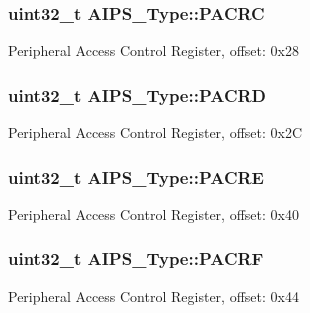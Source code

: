 \subsubsection[{\texorpdfstring{P\+A\+C\+RC}{PACRC}}]{ uint32\+\_\+t A\+I\+P\+S\+\_\+\+Type\+::\+P\+A\+C\+RC}\hypertarget{structAIPS__Type_a0df98dbca629285b81f2665f24de313c}{}\label{structAIPS__Type_a0df98dbca629285b81f2665f24de313c}
Peripheral Access Control Register, offset\+: 0x28 
\subsubsection[{\texorpdfstring{P\+A\+C\+RD}{PACRD}}]{ uint32\+\_\+t A\+I\+P\+S\+\_\+\+Type\+::\+P\+A\+C\+RD}\hypertarget{structAIPS__Type_aace64c8c28f2e8b815bdc2db2d004799}{}\label{structAIPS__Type_aace64c8c28f2e8b815bdc2db2d004799}
Peripheral Access Control Register, offset\+: 0x2C 
\subsubsection[{\texorpdfstring{P\+A\+C\+RE}{PACRE}}]{ uint32\+\_\+t A\+I\+P\+S\+\_\+\+Type\+::\+P\+A\+C\+RE}\hypertarget{structAIPS__Type_a6203ae75850730edcf4ce96ba5d97672}{}\label{structAIPS__Type_a6203ae75850730edcf4ce96ba5d97672}
Peripheral Access Control Register, offset\+: 0x40 
\subsubsection[{\texorpdfstring{P\+A\+C\+RF}{PACRF}}]{ uint32\+\_\+t A\+I\+P\+S\+\_\+\+Type\+::\+P\+A\+C\+RF}\hypertarget{structAIPS__Type_aafe60ca170ac633afa017287e6009d1d}{}\label{structAIPS__Type_aafe60ca170ac633afa017287e6009d1d}
Peripheral Access Control Register, offset\+: 0x44 
